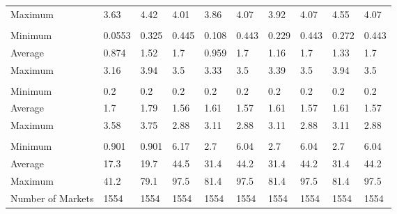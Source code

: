 \begin{tabular}[t]{llllllllll}
\hspace{1em}Maximum & 3.63 & 4.42 & 4.01 & 3.86 & 4.07 & 3.92 & 4.07 & 4.55 & 4.07\\
\addlinespace[0.3em]
\multicolumn{10}{l}{\textbf{Marginal Cost}}\\
\hspace{1em}Minimum & 0.0553 & 0.325 & 0.445 & 0.108 & 0.443 & 0.229 & 0.443 & 0.272 & 0.443\\
\hspace{1em}Average & 0.874 & 1.52 & 1.7 & 0.959 & 1.7 & 1.16 & 1.7 & 1.33 & 1.7\\
\hspace{1em}Maximum & 3.16 & 3.94 & 3.5 & 3.33 & 3.5 & 3.39 & 3.5 & 3.94 & 3.5\\
\addlinespace[0.3em]
\multicolumn{10}{l}{\textbf{Miles Flown}}\\
\hspace{1em}Minimum & 0.2 & 0.2 & 0.2 & 0.2 & 0.2 & 0.2 & 0.2 & 0.2 & 0.2\\
\hspace{1em}Average & 1.7 & 1.79 & 1.56 & 1.61 & 1.57 & 1.61 & 1.57 & 1.61 & 1.57\\
\hspace{1em}Maximum & 3.58 & 3.75 & 2.88 & 3.11 & 2.88 & 3.11 & 2.88 & 3.11 & 2.88\\
\addlinespace[0.3em]
\multicolumn{10}{l}{\textbf{Origin Service Ratio}}\\
\hspace{1em}Minimum & 0.901 & 0.901 & 6.17 & 2.7 & 6.04 & 2.7 & 6.04 & 2.7 & 6.04\\
\hspace{1em}Average & 17.3 & 19.7 & 44.5 & 31.4 & 44.2 & 31.4 & 44.2 & 31.4 & 44.2\\
\hspace{1em}Maximum & 41.2 & 79.1 & 97.5 & 81.4 & 97.5 & 81.4 & 97.5 & 81.4 & 97.5\\
\midrule
Number of Markets & 1554 & 1554 & 1554 & 1554 & 1554 & 1554 & 1554 & 1554 & 1554\\
\bottomrule
\end{tabular}
